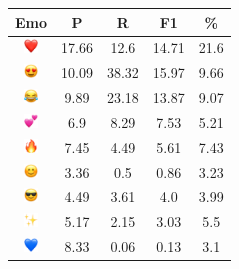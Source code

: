 \documentclass{article}
\begin{document}
\begin{table}
\centering
\begin{tabular}{|c|ccc|c|} \hline
\textbf{Emo} & \textbf{P} & \textbf{R} & \textbf{F1} & \textbf{\%} \\ \hline
\includegraphics[height=0.37cm,width=0.37cm]{img/red_heart.png} & 17.66 & 12.6 & 14.71 & 21.6\\ 
\includegraphics[height=0.37cm,width=0.37cm]{img/smiling_face_with_hearteyes.png} & 10.09 & 38.32 & 15.97 & 9.66\\ 
\includegraphics[height=0.37cm,width=0.37cm]{img/face_with_tears_of_joy.png} & 9.89 & 23.18 & 13.87 & 9.07\\ 
\includegraphics[height=0.37cm,width=0.37cm]{img/two_hearts.png} & 6.9 & 8.29 & 7.53 & 5.21\\ 
\includegraphics[height=0.37cm,width=0.37cm]{img/fire.png} & 7.45 & 4.49 & 5.61 & 7.43\\ 
\includegraphics[height=0.37cm,width=0.37cm]{img/smiling_face_with_smiling_eyes.png} & 3.36 & 0.5 & 0.86 & 3.23\\ 
\includegraphics[height=0.37cm,width=0.37cm]{img/smiling_face_with_sunglasses.png} & 4.49 & 3.61 & 4.0 & 3.99\\ 
\includegraphics[height=0.37cm,width=0.37cm]{img/sparkles.png} & 5.17 & 2.15 & 3.03 & 5.5\\ 
\includegraphics[height=0.37cm,width=0.37cm]{img/blue_heart.png} & 8.33 & 0.06 & 0.13 & 3.1\\ 

\end{tabular}
\end{table}
\end{document}
